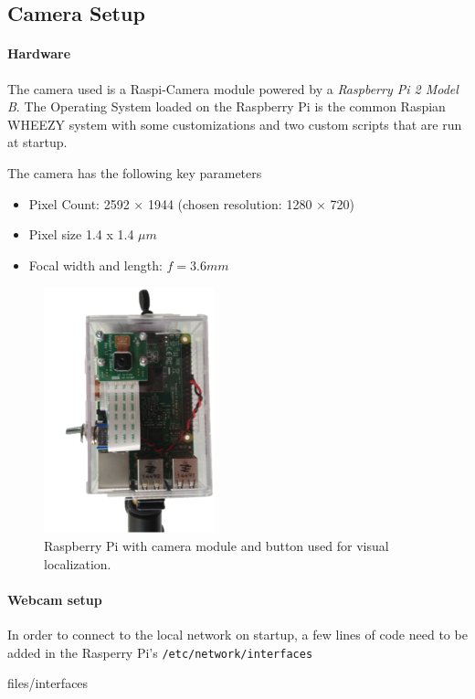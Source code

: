 \subsection{Camera Setup}

\paragraph{Hardware} The camera used is a Raspi-Camera module powered by a \textit{Raspberry Pi 2 Model B}.
The Operating System loaded on the Raspberry Pi is the common Raspian WHEEZY system with some customizations and two custom scripts that are run at startup. 

The camera has the following key parameters \cite{RaspiDoc}
\begin{itemize}
    \item Pixel Count: 2592 $\times$ 1944 (chosen resolution: 1280 $\times$ 720)
    \item Pixel size 1.4 x 1.4 $\mu m$
    \item Focal width and length: $f=3.6mm$
\end{itemize}

\begin{figure}
    \centering
    \includegraphics[width=0.25\linewidth]{files/RaspiCam.png}
    \caption{Raspberry Pi with camera module and button used for visual localization.}
    \label{fig:camera}
\end{figure}


\paragraph{Webcam setup} In order to connect to the local network on startup, a few lines of code need to be added in the Rasperry Pi's \texttt{/etc/network/interfaces} 

\begin{center}
\begin{minipage}{0.9\linewidth}
    \begin{lstinputlisting}[caption=\texttt{/etc/network/interfaces}., label=interfaces, frame=none]
        {files/interfaces}
\end{lstinputlisting}
\end{minipage}
\end{center}

